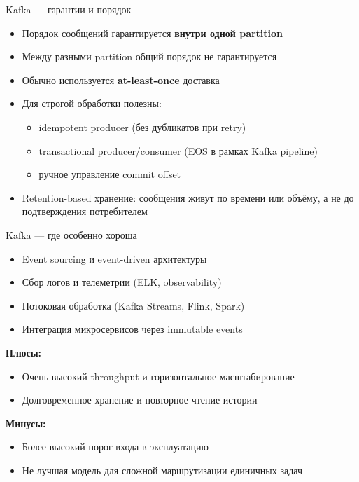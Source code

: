 \documentclass{beamer}
\begin{document}
\begin{frame}{Kafka --- гарантии и порядок}
\begin{itemize}
  \item Порядок сообщений гарантируется \textbf{внутри одной partition}
  \item Между разными partition общий порядок не гарантируется
  \item Обычно используется \textbf{at-least-once} доставка
  \item Для строгой обработки полезны:
  \begin{itemize}
    \item idempotent producer (без дубликатов при retry)
    \item transactional producer/consumer (EOS в рамках Kafka pipeline)
    \item ручное управление commit offset
  \end{itemize}
  \item Retention-based хранение: сообщения живут по времени или объёму, а не до подтверждения потребителем
\end{itemize}
\end{frame}

\begin{frame}{Kafka --- где особенно хороша}
\begin{itemize}
  \item Event sourcing и event-driven архитектуры
  \item Сбор логов и телеметрии (ELK, observability)
  \item Потоковая обработка (Kafka Streams, Flink, Spark)
  \item Интеграция микросервисов через immutable events
\end{itemize}
\vspace{0.3cm}
\textbf{Плюсы:}
\begin{itemize}
  \item Очень высокий throughput и горизонтальное масштабирование
  \item Долговременное хранение и повторное чтение истории
\end{itemize}
\textbf{Минусы:}
\begin{itemize}
  \item Более высокий порог входа в эксплуатацию
  \item Не лучшая модель для сложной маршрутизации единичных задач
\end{itemize}
\end{frame}
\end{document}
